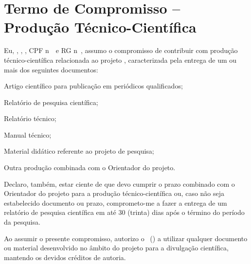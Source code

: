 
\cleardoublepage
   {\centering \section*{Termo de Compromisso -- Produção Técnico-Científica \label{sec:dec_prod_cientifica}} }
   \vspace{1cm}
   Eu, \textbf{\pesquisador}, \pesqnacionalidade, \pesqestadocivil, CPF n\ele\ \pesqcpf\ e RG n\ele\ \pesqrg, assumo o compromisso de contribuir com produção técnico-científica relacionada ao projeto \projeto, caracterizada pela entrega de um ou mais dos seguintes documentos:
   
   \begin{alineas}
       \item Artigo científico para publicação em periódicos qualificados;
       \item Relatório de pesquisa científica;
       \item Relatório técnico;
       \item Manual técnico;
       \item Material didático referente ao projeto de pesquisa;
       \item Outra produção combinada com o Orientador do projeto.
   \end{alineas}
   
   Declaro, também, estar ciente de que devo cumprir o prazo combinado com o Orientador do projeto para a produção técnico-científica ou, caso não seja estabelecido documento ou prazo, comprometo-me a fazer a entrega de um relatório de pesquisa científica em até 30 (trinta) dias após o término do período da pesquisa.
   
   Ao assumir o presente compromisso, autorizo o \Inova\ (\inova) a utilizar qualquer documento ou material desenvolvido no âmbito do projeto para a divulgação científica, mantendo os devidos créditos de autoria.

